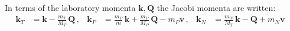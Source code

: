 In terms of the laboratory momenta $\bm{k}, \bm{Q}$ the Jacobi momenta are written:
\begin{align*}
  \bm{k}_{T}&= \bm{k} - \frac{m_{T}}{M_{T}}\, \bm{Q} \,, &
  \bm{k}_{P}&= \frac{m_{P}}{m}\,\bm{k} + \frac{m_{P}}{M_{P}}\, \bm{Q} - m_{P}\bm{v} \, , &
  \bm{k}_{N}&= \frac{m_{N}}{M_{T}}\,\bm{k} -  \bm{Q} + m_{N}\bm{v} &
\end{align*}

